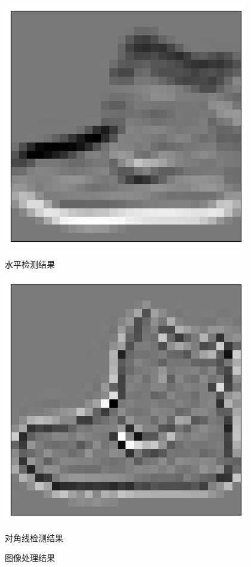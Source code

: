 \documentclass[a4paper,12pt]{article}
\begin{document}
\begin{figure}[h]
    \vspace{1em}  %

    \begin{minipage}{0.45\textwidth}
        \centering
        \includegraphics[width=\linewidth]{images/lab2_1_hori.png}
        \caption*{水平检测结果}
    \end{minipage}
    \hspace{0.05\textwidth}  %
    \begin{minipage}{0.45\textwidth}
        \centering
        \includegraphics[width=\linewidth]{images/lab2_1_diag.png}
        \caption*{对角线检测结果}
    \end{minipage}

    \caption{图像处理结果}  %
\end{figure}
\justifying
\end{document}
